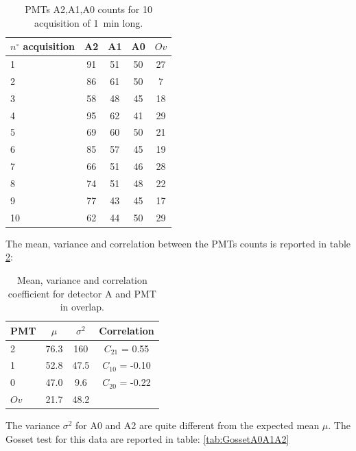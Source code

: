 \begin{table}[htb]
\centering
\begin{tabular}{lcccc}
\hline 
$n^{\circ}$ acquisition & A2 & A1 & A0 & $Ov$ \\ 
\hline 
1 & 91 & 51 & 50 & 27 \\ 
 
2 & 86 & 61 & 50 & 7 \\ 
 
3 & 58 & 48 & 45 & 18 \\ 
 
4 & 95 & 62 & 41 & 29 \\ 
 
5 & 69 & 60 & 50 & 21 \\ 
 
6 & 85 & 57 & 45 & 19 \\ 
 
7 & 66 & 51 & 46 & 28 \\ 
 
8 & 74 & 51 & 48 & 22 \\ 
 
9 & 77 & 43 & 45 & 17 \\ 
 
10 & 62 & 44 & 50 & 29 \\ 
\hline 
\end{tabular}
\caption{PMTs A2,A1,A0 counts for 10 acquisition of \SI{1}{\minute} long.}
\label{tab:PmtAproblem}
\end{table}

The mean, variance and correlation between the PMTs counts is reported in table \ref{tab:ResultAA}:

\begin{table}[!ht]
\centering
\begin{tabular}{lccc}
\hline 
PMT & $\mu$ & $\sigma^{2}$ & Correlation \\
\hline
2 	& 76.3	& 160	& $C_{21}$ = 0.55 \\
1 	& 52.8	& 47.5	& $C_{10}$ = -0.10 \\
0	& 47.0	& 9.6   & $C_{20}$ = -0.22 \\
\hline
$Ov$ & 21.7 & 48.2 & \\
\hline
\end{tabular}
\caption{Mean, variance and correlation coefficient for detector A and PMT in overlap.}
\label{tab:ResultAA}
\end{table}


The variance $\sigma^{2}$ for A0 and A2 are quite different from the expected mean $\mu$. The Gosset test for this data are reported in table: \ref{tab:GossetA0A1A2} 

